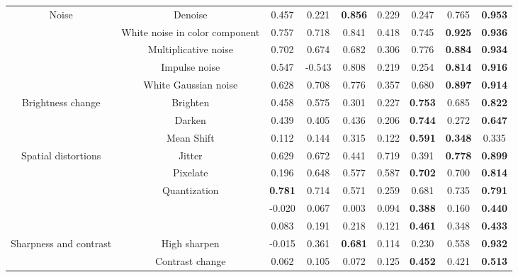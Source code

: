 \begin{table}[!ht]
{\begin{tabular}{cc|cccccc|c}
				\multicolumn{1}{c|}{\multirow{5}{*}{Noise}} & Denoise & 0.457 & 0.221 & \textbf{0.856} & 0.229 & 0.247 & 0.765 & \textbf{0.953} \\	
				\multicolumn{1}{c|}{} & White noise in color component & 0.757 & 0.718 & 0.841 & 0.418 & 0.745 & \textbf{0.925} & \textbf{0.936} \\			
				\multicolumn{1}{c|}{} & Multiplicative noise & 0.702 & 0.674 & 0.682 & 0.306 & 0.776 & \textbf{0.884} & \textbf{0.934} \\
				\multicolumn{1}{c|}{} & Impulse noise & 0.547 & -0.543 & 0.808 & 0.219 & 0.254 & \textbf{0.814} & \textbf{0.916} \\
				\multicolumn{1}{c|}{} & White Gaussian noise & 0.628 & 0.708 & 0.776 & 0.357 & 0.680 & \textbf{0.897} & \textbf{0.914} \\ \midrule

				\multicolumn{1}{c|}{\multirow{3}{*}{Brightness change}} & Brighten & 0.458 & 0.575 & 0.301 & 0.227 & \textbf{0.753} & 0.685 & \textbf{0.822} \\
				\multicolumn{1}{c|}{} & Darken & 0.439 & 0.405 & 0.436 & 0.206 & \textbf{0.744} & 0.272 & \textbf{0.647} \\
				\multicolumn{1}{c|}{} & Mean Shift & 0.112 & 0.144 & 0.315 & 0.122 & \textbf{0.591} & \textbf{0.348} & 0.335 \\ \midrule
				
				\multicolumn{1}{c|}{\multirow{5}{*}{Spatial distortions}} & Jitter & 0.629 & 0.672 & 0.441 & 0.719 & 0.391 & \textbf{0.778} & \textbf{0.899} \\
				\multicolumn{1}{c|}{} & Pixelate & 0.196 & 0.648 & 0.577 & 0.587 & \textbf{0.702} & 0.700 & \textbf{0.814} \\
				\multicolumn{1}{c|}{} & Quantization & \textbf{0.781} & 0.714 & 0.571 & 0.259 & 0.681 & 0.735 & \textbf{0.791} \\
				\multicolumn{1}{c|}{} & \color{blue}{Color block} & -0.020 & 0.067 & 0.003 & 0.094 & \textbf{0.388} & 0.160 & \textbf{0.440} \\
				\multicolumn{1}{c|}{} & \color{blue}{Non-eccentricity patch} & 0.083 & 0.191 & 0.218 & 0.121 & \textbf{0.461} & 0.348 & \textbf{0.433} \\ \midrule
				
				\multicolumn{1}{c|}{\multirow{2}{*}{Sharpness and contrast}} & High sharpen & -0.015 & 0.361 & \textbf{0.681} & 0.114 & 0.230 & 0.558 & \textbf{0.932} \\
				\multicolumn{1}{c|}{} & Contrast change & 0.062 & 0.105 & 0.072 & 0.125 & \textbf{0.452} & 0.421 & \textbf{0.513} \\ \bottomrule
			\end{tabular}
		}
	\end{table}
	
